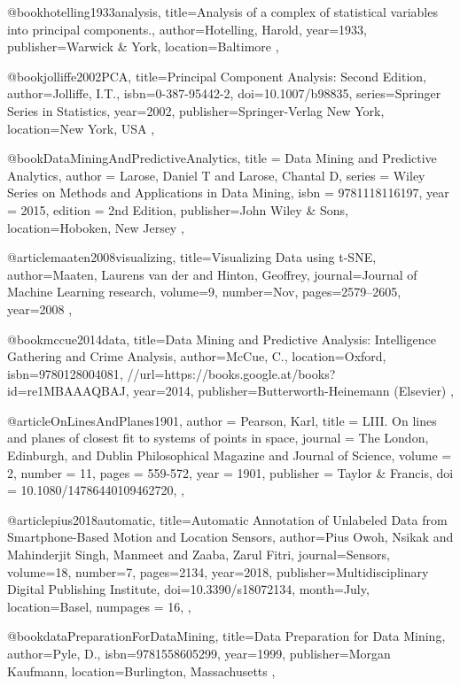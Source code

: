 @book{hotelling1933analysis,
  title={Analysis of a complex of statistical variables into principal components.},
  author={Hotelling, Harold},
  year={1933},
  publisher={Warwick \& York},
  location={Baltimore}
},


@book{jolliffe2002PCA,
  title={Principal Component Analysis: Second Edition},
  author={Jolliffe, I.T.},
  isbn={0-387-95442-2},
  doi={10.1007/b98835},
  series={Springer Series in Statistics},
  year={2002},
  publisher={Springer-Verlag New York},
  location={New York, USA}
},

@book{DataMiningAndPredictiveAnalytics,
  title = {Data Mining and Predictive Analytics},
  author = {Larose, Daniel T and Larose, Chantal D},
  series = {Wiley Series on Methods and Applications in Data Mining},
  isbn = {9781118116197},
  year = {2015},
  edition = {2nd Edition},
  publisher={John Wiley \& Sons},
  location={Hoboken, New Jersey}
},

@article{maaten2008visualizing,
  title={Visualizing Data using t-SNE},
  author={Maaten, Laurens van der and Hinton, Geoffrey},
  journal={Journal of Machine Learning research},
  volume={9},
  number={Nov},
  pages={2579--2605},
  year={2008}
},


@book{mccue2014data,
  title={Data Mining and Predictive Analysis: Intelligence Gathering and Crime Analysis},
  author={McCue, C.},
  location={Oxford},
  isbn={9780128004081},
  //url={https://books.google.at/books?id=re1MBAAAQBAJ},
  year={2014},
  publisher={Butterworth-Heinemann (Elsevier)}
},

@article{OnLinesAndPlanes1901,
  author = {Pearson, Karl},
  title = {LIII. On lines and planes of closest fit to systems of points in space},
  journal = {The London, Edinburgh, and Dublin Philosophical Magazine and Journal of Science},
  volume = {2},
  number = {11},
  pages = {559-572},
  year  = {1901},
  publisher = {Taylor & Francis},
  doi = {10.1080/14786440109462720},
},

@article{pius2018automatic,
  title={Automatic Annotation of Unlabeled Data from Smartphone-Based Motion and Location Sensors},
  author={Pius Owoh, Nsikak and Mahinderjit Singh, Manmeet and Zaaba, Zarul Fitri},
  journal={Sensors},
  volume={18},
  number={7},
  pages={2134},
  year={2018},
  publisher={Multidisciplinary Digital Publishing Institute},
  doi={10.3390/s18072134},
  month={July},
  location={Basel},
  numpages = {16},
},

@book{dataPreparationForDataMining,
  title={Data Preparation for Data Mining},
  author={Pyle, D.},
  isbn={9781558605299},
  year={1999},
  publisher={Morgan Kaufmann},
  location={Burlington, Massachusetts}
},


